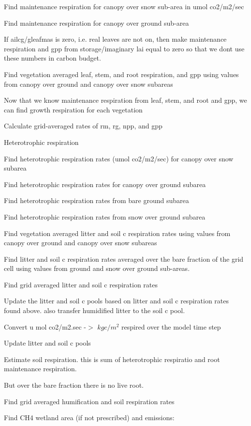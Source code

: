 Find maintenance respiration for canopy over snow sub-\/area in umol co2/m2/sec

Find maintenance respiration for canopy over ground sub-\/area

If ailcg/gleafmas is zero, i.\+e. real leaves are not on, then make maintenance respiration and gpp from storage/imaginary lai equal to zero so that we don\textquotesingle{}t use these numbers in carbon budget.

Find vegetation averaged leaf, stem, and root respiration, and gpp using values from canopy over ground and canopy over snow subareas

Now that we know maintenance respiration from leaf, stem, and root and gpp, we can find growth respiration for each vegetation

Calculate grid-\/averaged rates of rm, rg, npp, and gpp

Heterotrophic respiration

Find heterotrophic respiration rates (umol co2/m2/sec) for canopy over snow subarea

Find heterotrophic respiration rates for canopy over ground subarea

Find heterotrophic respiration rates from bare ground subarea

Find heterotrophic respiration rates from snow over ground subarea

Find vegetation averaged litter and soil c respiration rates using values from canopy over ground and canopy over snow subareas

Find litter and soil c respiration rates averaged over the bare fraction of the grid cell using values from ground and snow over ground sub-\/areas.

Find grid averaged litter and soil c respiration rates

Update the litter and soil c pools based on litter and soil c respiration rates found above. also transfer humidified litter to the soil c pool.

Convert u mol co2/m2.\+sec -\/$>$ $kg c/m^2$ respired over the model time step

Update litter and soil c pools

Estimate soil respiration. this is sum of heterotrophic respiratio and root maintenance respiration.

But over the bare fraction there is no live root.

Find grid averaged humification and soil respiration rates

Find C\+H4 wetland area (if not prescribed) and emissions\+:

